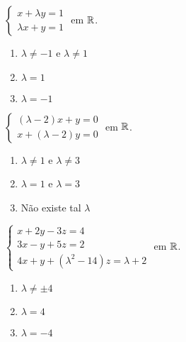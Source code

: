 \documentclass[12pt]{exam}
\begin{document}
\begin{exercicio}\label{sistemasinicio}
  $
    \begin{cases}
      x + \lambda y = 1\\
      \lambda x + y = 1
    \end{cases}
  $
  em $\mathbb{R}$.
  \begin{solucao}
    \begin{enumerate}[label={\alph*})]
      \item $\lambda \ne -1$ e $\lambda \ne 1$
      \item $\lambda = 1$
      \item $\lambda = -1$
    \end{enumerate}
  \end{solucao}
\end{exercicio}

\begin{exercicio}
  $
    \begin{cases}
      (\lambda - 2)x + y = 0\\
      x + (\lambda - 2)y = 0
    \end{cases}
  $
  em $\mathbb{R}$.
  \begin{solucao}
    \begin{enumerate}[label={\alph*})]
      \item $\lambda \ne 1$ e $\lambda \ne 3$
      \item $\lambda = 1$ e $\lambda = 3$
      \item Não existe tal $\lambda$
    \end{enumerate}
  \end{solucao}
\end{exercicio}

\begin{exercicio}
  $
    \begin{cases}
      x + 2y - 3z = 4\\
      3x - y + 5z = 2\\
      4x + y + (\lambda^2 - 14)z = \lambda + 2
    \end{cases}
  $
  em $\mathbb{R}$.
  \begin{solucao}
    \begin{enumerate}[label={\alph*})]
      \item $\lambda \ne \pm 4$
      \item $\lambda = 4$
      \item $\lambda = -4$
    \end{enumerate}
  \end{solucao}
\end{exercicio}
\end{document}
